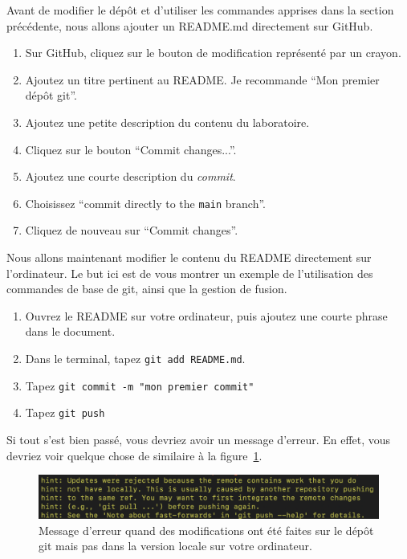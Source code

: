 \documentclass{book}
\newenvironment{myexampleblock}[1]{%
    \tcolorbox[beamer,%
    noparskip,breakable,
    colback=LightGreen,colframe=DarkGreen,%
    colbacklower=LimeGreen!75!LightGreen,%
    title={#1}, width=\textwidth]}%
    {\endtcolorbox}
\begin{document}
Avant de modifier le dépôt et d'utiliser les commandes apprises dans la section précédente, nous allons ajouter un README.md directement sur GitHub.

\begin{myexampleblock}{Exercice : Modifier le README sur GitHub}
\begin{enumerate}
        \item Sur GitHub, cliquez sur le bouton de modification représenté par un crayon. 
        \item Ajoutez un titre pertinent au README. Je recommande ``Mon premier dépôt git''.
        \item Ajoutez une petite description du contenu du laboratoire.
        \item Cliquez sur le bouton ``Commit changes...''.
        \item Ajoutez une courte description du \emph{commit}.
        \item Choisissez ``commit directly to the \texttt{main} branch''.
        \item Cliquez de nouveau sur ``Commit changes''.
\end{enumerate}
\end{myexampleblock}

Nous allons maintenant modifier le contenu du README directement sur l'ordinateur. Le but ici est de vous montrer un exemple de l'utilisation des commandes de base de git, ainsi que la gestion de fusion.
\begin{myexampleblock}{Exercice : Modifier le README dans le dépôt local}
    \begin{enumerate}
        \item Ouvrez le README sur votre ordinateur, puis ajoutez une courte phrase dans le document. 
        \item Dans le terminal, tapez \texttt{git add README.md}.
        \item Tapez \texttt{git commit -m "mon premier commit"}
        \item Tapez \texttt{git push}
    \end{enumerate}
\end{myexampleblock}

Si tout s'est bien passé, vous devriez avoir un message d'erreur. En effet, vous devriez voir quelque chose de similaire à la figure~\ref{fig:erreur_push_git}.
\begin{figure}[!h]
    \centering
    \includegraphics[width=\textwidth]{images/erreur_push_git.png}
    \caption{Message d'erreur quand des modifications ont été faites sur le dépôt git mais pas dans la version locale sur votre ordinateur.}\label{fig:erreur_push_git}
\end{figure}
\end{document}
